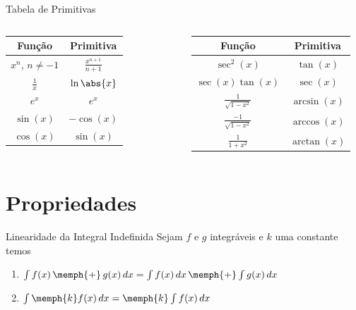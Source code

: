 \begin{frame}{Tabela de Primitivas}
\renewcommand*{\arraystretch}{1.8}
\begin{columns}
\centering
  \begin{tabular}{c<{\;}>{\;}c}
    \hline
    Função                      & Primitiva               \\ \hline
    \(x^n\), \(n \neq -1\)      & \(\frac{x^{n+1}}{n+1}\) \\[1mm]
    \(\frac{1}{x}\)             & \(\ln\abs{x}\)          \\
    \(e^x\)                     & \(e^x\)                 \\
    \(\sin(x) \)                & \(-\cos(x)\)            \\
    \( \cos(x)\)                & \(\sin(x)\)             \\\hline
  \end{tabular}
\centering
  \begin{tabular}{c<{\;}>{\;}c}
    \hline
    Função                      & Primitiva               \\ \hline
    \(\sec^2(x)\)               & \(\tan(x)\)             \\
    \(\sec(x) \tan(x)\)         & \(\sec(x)\)             \\[1mm]
    \(\frac{1}{\sqrt{1-x^2}}\)  & \(\arcsin(x)\)          \\[2mm]
    \(\frac{-1}{\sqrt{1-x^2}}\) & \(\arccos(x)\)          \\[2mm]
    \(\frac{1}{1+x^2}\)         & \(\arctan(x)\)          \\[3mm] \hline
  \end{tabular}
\end{columns}
\end{frame}

\section{Propriedades}

\begin{frame}{Linearidade da Integral Indefinida}
  Sejam $f$ e $g$ integráveis e $k$ uma constante temos \\[7mm]
  \pause
  \begin{enumerate}[<+->]
    \item \(\int f(x) \,\memph{+}\, g(x) \,dx
          = \int f(x) \,dx \,\memph{+} \int g(x) \,dx\) \\[7mm]
    \item \(\int \memph{k} f(x) \,dx = \memph{k} \int f(x) \,dx\)
  \end{enumerate}
\end{frame}

